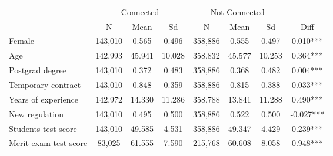 \begin{tabular}{lccccccc}
\hline  & \multicolumn{3}{c}{Connected} & \multicolumn{3}{c}{Not Connected} & \\
 & N & Mean & Sd & N & Mean & Sd & Diff\\
\hline Female & 143,010 & 0.565 & 0.496 & 358,886 & 0.555 & 0.497 & 0.010***\\
Age & 142,993 & 45.941 & 10.028 & 358,832 & 45.577 & 10.253 & 0.364***\\
Postgrad degree & 143,010 & 0.372 & 0.483 & 358,886 & 0.368 & 0.482 & 0.004***\\
Temporary contract & 143,010 & 0.848 & 0.359 & 358,886 & 0.815 & 0.388 & 0.033***\\
Years of experience & 142,972 & 14.330 & 11.286 & 358,788 & 13.841 & 11.288 & 0.490***\\
New regulation & 143,010 & 0.495 & 0.500 & 358,886 & 0.522 & 0.500 & -0.027***\\
Students test score & 143,010 & 49.585 & 4.531 & 358,886 & 49.347 & 4.429 & 0.239***\\
Merit exam test score & 83,025 & 61.555 & 7.590 & 215,768 & 60.608 & 8.058 & 0.948***\\
\hline\end{tabular}\\
\hfil\\
